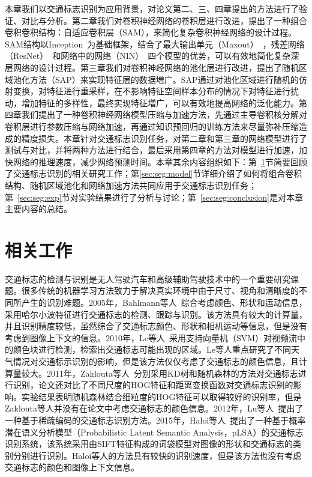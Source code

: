 本章我们以交通标志识别为应用背景，对论文第二、三、四章提出的方法进行了验证、对比与分析。第二章我们对卷积神经网络的卷积层进行改进，提出了一种组合卷积卷积结构：自适应卷积层（SAM），来简化复杂卷积神经网络的设计过程。SAM结构以Inception~\cite{szegedy2014going,szegedy2015rethinking,szegedy2016inception}为基础框架，结合了最大输出单元（Maxout）~\cite{goodfellow2013maxout}，残差网络（ResNet）~\cite{he2015deep}和网络中的网络（NIN）~\cite{DBLP:journals/corr/LinCY13}四个模型的优势，可以有效地简化复杂深层网络的设计过程。第三章我们对卷积神经网络的池化层进行改进，提出了随机区域池化方法（SAP）来实现特征层的数据増广。SAP通过对池化区域进行随机的仿射变换，对特征进行重采样，在不影响特征空间样本分布的情况下对特征进行扰动，增加特征的多样性，最终实现特征増广，可以有效地提高网络的泛化能力。第四章我们提出了一种卷积神经网络模型压缩与加速方法，先通过主导卷积核分解对卷积层进行参数压缩与网络加速，再通过知识预回归的训练方法来尽量弥补压缩造成的精度损失。本章针对交通标志识别任务，对第二章和第三章的网络模型进行了测试与对比，并将两种方法进行结合，最后采用第四章的方法对模型进行加速，加快网络的推理速度，减少网络预测时间。本章其余内容组织如下：第~\ref{sec:seg:relate}节简要回顾了交通标志识别的相关研究工作；第\ref{sec:seg:model}节详细介绍了如何将组合卷积结构、随机区域池化和网络加速方法共同应用于交通标志识别任务；第~\ref{sec:seg:exp}节对实验结果进行了分析与讨论；第~\ref{sec:seg:conclusion}是对本章主要内容的总结。

\section{相关工作}
\label{sec:seg:relate}

交通标志的检测与识别是无人驾驶汽车和高级辅助驾驶技术中的一个重要研究课题。很多传统的机器学习方法致力于解决真实环境中由于尺寸、视角和清晰度的不同所产生的识别难题。2005年，Bahlmann等人~\cite{bahlmann2005system}综合考虑颜色、形状和运动信息，采用哈尔小波特征进行交通标志的检测、跟踪与识别。该方法具有较大的计算量，并且识别精度较低，虽然综合了交通标志颜色、形状和相机运动等信息，但是没有考虑到图像上下文的信息。2010年，Le等人~\cite{le2010real}采用支持向量机（SVM）对视频流中的颜色块进行检测，检索出交通标志可能出现的区域。Le等人重点研究了不同天气情况对交通标示识别的影响，但是该方法仅仅考虑了交通标志的颜色信息，且计算量较大。2011年，Zaklouta等人~\cite{zaklouta2011traffic}分别采用KD树和随机森林的方法对交通标志进行识别，论文还对比了不同尺度的HOG特征和距离变换函数对交通标志识别的影响。实验结果表明随机森林结合细粒度的HOG特征可以取得较好的识别率，但是Zaklouta等人并没有在论文中考虑交通标志的颜色信息。2012年，Lu等人~\cite{lu2012sparse}提出了一种基于稀疏编码的交通标志识别方法。2015年，Haloi等人~\cite{haloi2015novel}提出了一种基于概率潜在语义分析模型（Probabilistic Latent Semantic Analysis，pLSA）的交通标志识别系统，该系统采用由SIFT特征构成的词袋模型对图像的形状和交通标志的类别分别进行识别。Haloi等人的方法具有较快的识别速度，但是该方法也没有考虑交通标志的颜色和图像上下文信息。


